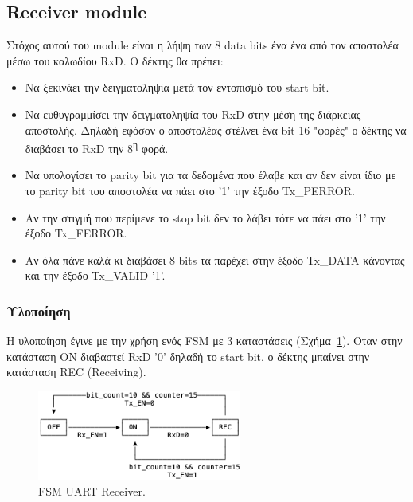 \documentclass[../main.tex]{subfiles}
\begin{document}
\subsection{Receiver module}
Στόχος αυτού του module είναι η λήψη των 8 data bits ένα ένα από τον αποστολέα
μέσω του καλωδίου RxD. Ο δέκτης θα πρέπει:

\begin{itemize}
  \item Να ξεκινάει την δειγματοληψία μετά τον εντοπισμό του start bit.
  \item Να ευθυγραμμίσει την δειγματοληψία του RxD στην μέση της διάρκειας
    αποστολής. Δηλαδή εφόσον ο αποστολέας στέλνει ένα bit 16 "φορές" ο δέκτης να
    διαβάσει το RxD την 8\textsuperscript{η} φορά.
  \item Να υπολογίσει το parity bit για τα δεδομένα που έλαβε και αν δεν είναι
    ίδιο με το parity bit του αποστολέα να πάει στο '1' την έξοδο Tx\_PERROR.
  \item Αν την στιγμή που περίμενε το stop bit δεν το λάβει τότε να πάει στο '1'
    την έξοδο Tx\_FERROR.
  \item Αν όλα πάνε καλά κι διαβάσει 8 bits τα παρέχει στην έξοδο Tx\_DATA
    κάνοντας και την έξοδο Tx\_VALID '1'.
\end{itemize}

\subsubsection*{Υλοποίηση}

Η υλοποίηση έγινε με την χρήση ενός FSM με 3 καταστάσεις
(Σχήμα~\ref{fig:uart_receiver_fsm}). Όταν στην κατάσταση ON διαβαστεί RxD '0'
δηλαδή το start bit, ο δέκτης μπαίνει στην κατάσταση REC (Receiving).

\begin{figure}[H]
  \begin{center}
    \includegraphics[width=0.6\textwidth]{../../monodraw/UartReceiver.png}
  \end{center}
  \caption{FSM UART Receiver.}
  \label{fig:uart_receiver_fsm}
\end{figure}
\end{document}
